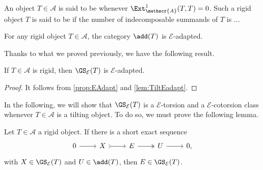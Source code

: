 \begin{definition}
\label{def:rigidtilting}
An object $T \in \mathscr{A}$ is said to be  whenever $\Ext_\mathscr{A}^1(T,T) = 0$. Such a rigid object $T$ is said to be  if the number of indecomposable summands of $T$ is ... 
\end{definition}

\begin{lemma} \label{lem:TiltEadapt}
    For any rigid object $T \in \mathscr{A}$, the category $\add(T)$ is $\mathcal{E}$-adapted.
\end{lemma}


Thanks to what we proved previously, we have the following result.

\begin{cor} \label{cor:rigidEadapt}
    If $T \in \mathscr{A}$ is rigid, then $\GS_{\mathcal{E}}(T)$ is $\mathcal{E}$-adapted.
\end{cor}

\begin{proof}
     It follows from \cref{prop:EAdapt} and \cref{lem:TiltEadapt}.
\end{proof}

In the following, we will show that $\GS_\mathcal{E}(T)$ is a $\mathcal{E}$-torsion and a $\mathcal{E}$-cotorsion class whenever $T \in \mathscr{A}$ is a tilting object. To do so, we must prove the following lemma.

\begin{lemma}
\label{lemmaExtclosedinduction}
Let $T \in \mathscr{A}$ a rigid object. If there is a short exact sequence 
\[\begin{tikzcd}
	0 & X & E  & U &  0,
	\arrow[from=1-1, to=1-2]
	\arrow[tail, from=1-2, to=1-3]
	\arrow[two heads,from=1-3, to=1-4]
	\arrow[from=1-4, to=1-5]
\end{tikzcd} \] with $X \in \GS_{\mathcal{E}}(T)$ and $U \in \add(T)$, then $E \in \GS_{\mathcal{E}}(T)$.
\end{lemma}

